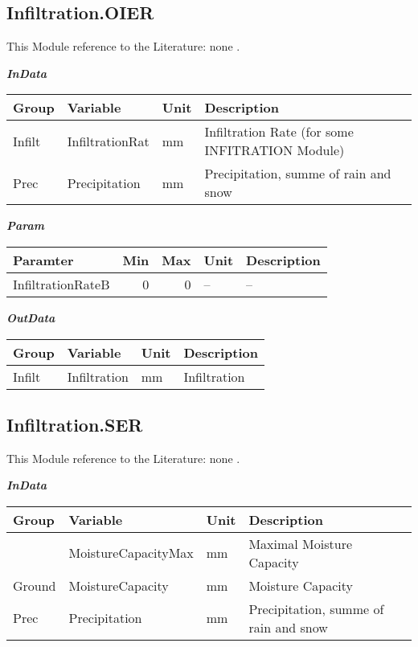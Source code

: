 \documentclass[
]{book}
\begin{document}
\hypertarget{infiltration.oier}{%
\subsection{Infiltration.OIER}\label{infiltration.oier}}

This Module reference to the Literature: none \citep{none}.

\textbf{\emph{InData}}

\begin{table}[!h]
\centering
\begin{tabular}{l|l|l|l}
\hline
Group & Variable & Unit & Description\\
\hline
Infilt & InfiltrationRat & mm & Infiltration Rate (for some INFITRATION Module)\\
\cline{1-4}
Prec & Precipitation & mm & Precipitation, summe of rain and snow\\
\hline
\end{tabular}
\end{table}

\textbf{\emph{Param}}

\begin{table}[!h]
\centering
\begin{tabular}{l|r|r|l|l}
\hline
Paramter & Min & Max & Unit & Description\\
\hline
InfiltrationRateB & 0 & 0 & -- & --\\
\hline
\end{tabular}
\end{table}

\textbf{\emph{OutData}}

\begin{table}[!h]
\centering
\begin{tabular}{l|l|l|l}
\hline
Group & Variable & Unit & Description\\
\hline
Infilt & Infiltration & mm & Infiltration\\
\hline
\end{tabular}
\end{table}

\hypertarget{infiltration.ser}{%
\subsection{Infiltration.SER}\label{infiltration.ser}}

This Module reference to the Literature: none \citep{none}.

\textbf{\emph{InData}}

\begin{table}[!h]
\centering
\begin{tabular}{l|l|l|l}
\hline
Group & Variable & Unit & Description\\
\hline
 & MoistureCapacityMax & mm & Maximal Moisture Capacity\\
\cline{2-4}
\multirow{-2}{*}{\raggedright\arraybackslash Ground} & MoistureCapacity & mm & Moisture Capacity\\
\cline{1-4}
Prec & Precipitation & mm & Precipitation, summe of rain and snow\\
\hline
\end{tabular}
\end{table}
\end{document}
